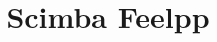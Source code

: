 \documentclass[options]{beamer}
\begin{document}
\title{Scimba Feelpp}

\begin{frame}
  \titlepage
\end{frame}
\end{document}
